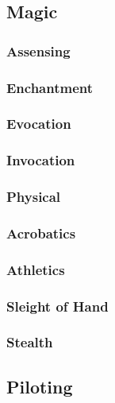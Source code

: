\subsection{Magic}

\subsubsection{Assensing}

\subsubsection{Enchantment}

\subsubsection{Evocation}

\subsubsection{Invocation}

\subsubsection{Physical}

\subsubsection{Acrobatics}

\subsubsection{Athletics}

\subsubsection{Sleight of Hand}

\subsubsection{Stealth}


\subsection{Piloting}

